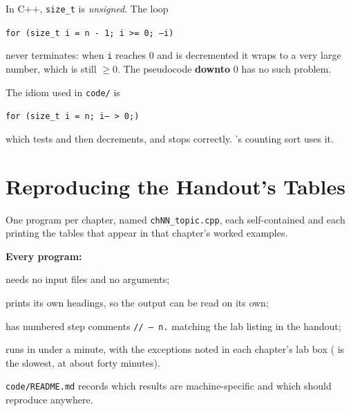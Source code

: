 \begin{alertbox}
In C++, \texttt{size\_t} is \emph{unsigned}. The loop
\begin{center}
\texttt{for (size\_t i = n - 1; i >= 0; --i)}
\end{center}
never terminates: when \texttt{i} reaches 0 and is decremented it wraps to a
very large number, which is still $\ge 0$. The pseudocode
\textbf{downto} $0$ has no such problem.

\smallskip
The idiom used in \texttt{code/} is
\begin{center}
\texttt{for (size\_t i = n; i-- > 0;)}
\end{center}
which tests and then decrements, and stops correctly. 's
counting sort uses it.
\end{alertbox}

\section{Reproducing the Handout's Tables}

\begin{conceptbox}
One program per chapter, named \texttt{chNN\_topic.cpp}, each self-contained
and each printing the tables that appear in that chapter's worked examples.

\smallskip
\textbf{Every program:}
\begin{tight}
  \item needs no input files and no arguments;
  \item prints its own headings, so the output can be read on its own;
  \item has numbered step comments \texttt{// --- n.} matching the lab listing
        in the handout;
  \item runs in under a minute, with the exceptions noted in each chapter's lab
        box ( is the slowest, at about forty minutes).
\end{tight}

\smallskip
\texttt{code/README.md} records which results are machine-specific and which
should reproduce anywhere.
\end{conceptbox}

